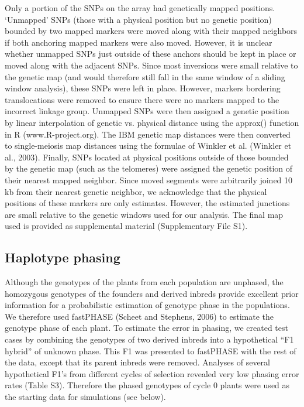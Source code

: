 Only a portion of the SNPs on the array had genetically mapped positions. ‘Unmapped’ SNPs (those with a physical position but no genetic position) bounded by two mapped markers were moved along with their mapped neighbors if both anchoring mapped markers were also moved. However, it is unclear whether unmapped SNPs just outside of these anchors should be kept in place or moved along with the adjacent SNPs. Since most inversions were small relative to the genetic map (and would therefore still fall in the same window of a sliding window analysis), these SNPs were left in place. However, markers bordering translocations were removed to ensure there were no markers mapped to the incorrect linkage group. Unmapped SNPs were then assigned a genetic position by linear interpolation of genetic vs. physical distance using the approx() function in R (www.R-project.org). 
The IBM genetic map distances were then converted to single-meiosis map distances using the formulae of Winkler et al. (Winkler et al., 2003). 
Finally, SNPs located at physical positions outside of those bounded by the genetic map (such as the telomeres) were assigned the genetic position of their nearest mapped neighbor. Since moved segments were arbitrarily joined 10 kb from their nearest genetic neighbor, we acknowledge that the physical positions of these markers are only estimates. However, the estimated junctions are small relative to the genetic windows used for our analysis. 
The final map used is provided as supplemental material (Supplementary File S1).
	
\subsection*{Haplotype phasing}
 Although the genotypes of the plants from each population are unphased, the homozygous genotypes of the founders and derived inbreds provide excellent prior information for a probabilistic estimation of genotype phase in the populations. We therefore used fastPHASE (Scheet and Stephens, 2006) to estimate the genotype phase of each plant. To estimate the error in phasing, we created test cases by combining the genotypes of two derived inbreds into a hypothetical “F1 hybrid” of unknown phase. This F1 was presented to fastPHASE with the rest of the data, except that its parent inbreds were removed. Analyses of several hypothetical F1’s from different cycles of selection revealed very low phasing error rates (Table S3). Therefore the phased genotypes of cycle 0 plants were used as the starting data for simulations (see below).

